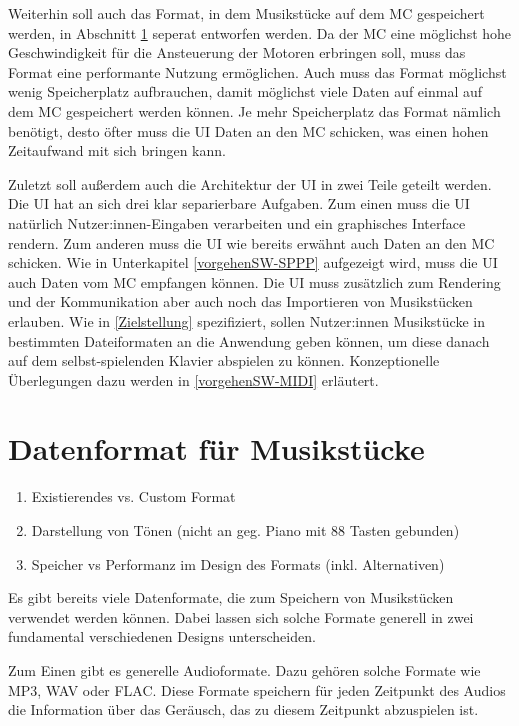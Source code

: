 Weiterhin soll auch das Format, in dem Musikstücke auf dem \ac{MC} gespeichert werden, in Abschnitt \ref{vorgehenSW-PIDI} seperat entworfen werden.
Da der \ac{MC} eine möglichst hohe Geschwindigkeit für die Ansteuerung der Motoren erbringen soll, muss das Format eine performante Nutzung ermöglichen.
Auch muss das Format möglichst wenig Speicherplatz aufbrauchen, damit möglichst viele Daten auf einmal auf dem \ac{MC} gespeichert werden können.
Je mehr Speicherplatz das Format nämlich benötigt, desto öfter muss die \ac{UI} Daten an den \ac{MC} schicken, was einen hohen Zeitaufwand mit sich bringen kann.

Zuletzt soll außerdem auch die Architektur der \ac{UI} in zwei Teile geteilt werden.
Die \ac{UI} hat an sich drei klar separierbare Aufgaben.
Zum einen muss die \ac{UI} natürlich Nutzer:innen-Eingaben verarbeiten und ein graphisches Interface rendern.
Zum anderen muss die \ac{UI} wie bereits erwähnt auch Daten an den \ac{MC} schicken.
Wie in Unterkapitel \ref{vorgehenSW-SPPP} aufgezeigt wird, muss die \ac{UI} auch Daten vom \ac{MC} empfangen können.
Die UI muss zusätzlich zum Rendering und der Kommunikation aber auch noch das Importieren von Musikstücken erlauben.
Wie in \ref{Zielstellung} spezifiziert, sollen Nutzer:innen Musikstücke in bestimmten Dateiformaten an die Anwendung geben können, um diese danach auf dem selbst-spielenden Klavier abspielen zu können.
Konzeptionelle Überlegungen dazu werden in \ref{vorgehenSW-MIDI} erläutert.


\section{Datenformat für Musikstücke} \label{vorgehenSW-PIDI}
\begin{enumerate}
    \item Existierendes vs. Custom Format
    \item Darstellung von Tönen (nicht an geg. Piano mit 88 Tasten gebunden)
    \item Speicher vs Performanz im Design des Formats (inkl. Alternativen)
\end{enumerate}

Es gibt bereits viele Datenformate, die zum Speichern von Musikstücken verwendet werden können. Dabei lassen sich solche Formate generell in zwei fundamental verschiedenen Designs unterscheiden.

Zum Einen gibt es generelle Audioformate. Dazu gehören solche Formate wie MP3, WAV oder FLAC.
Diese Formate speichern für jeden Zeitpunkt des Audios die Information über das Geräusch, das zu diesem Zeitpunkt abzuspielen ist.

